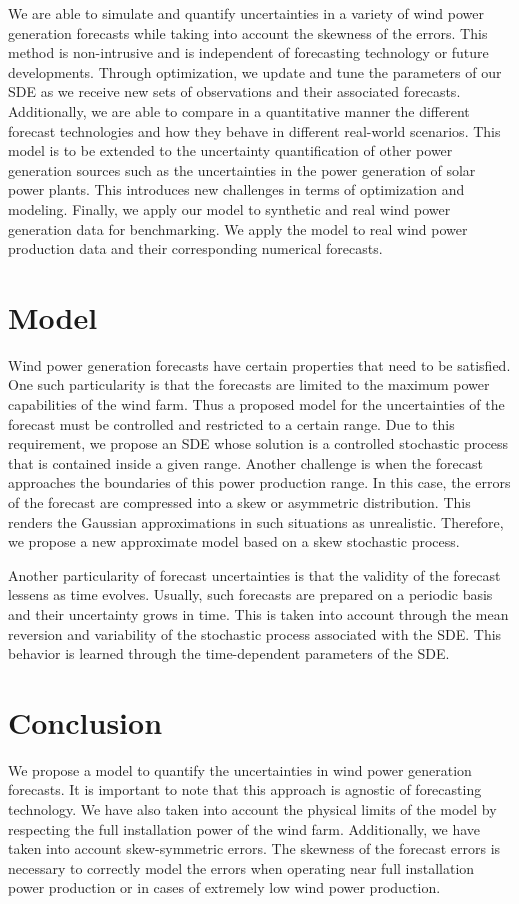 \documentclass[12pt]{article}
\theoremstyle{definition}
\theoremstyle{remark}
\begin{document}
    We are able to simulate and quantify uncertainties in a variety of wind power generation forecasts while taking into account the skewness of the errors. This method is non-intrusive and is independent of forecasting technology or future developments. Through optimization, we update and tune the parameters of our SDE as we receive new sets of observations and their associated forecasts. Additionally, we are able to compare in a quantitative manner the different forecast technologies and how they behave in different real-world scenarios. This model is to be extended to the uncertainty quantification of other power generation sources such as the uncertainties in the power generation of solar power plants. This introduces new challenges in terms of optimization and modeling. Finally, we apply our model to synthetic and real wind power generation data for benchmarking. We apply the model to real  wind power production data and their corresponding numerical forecasts.


\section{Model}
Wind power generation forecasts have certain properties that need to be satisfied. One such particularity is that the forecasts are limited to the maximum power capabilities of the wind farm. Thus a proposed model for the uncertainties of the forecast must be controlled and restricted to a certain range. Due to this requirement, we propose an SDE whose solution is a controlled stochastic process that is contained inside a given range. Another challenge is when the forecast approaches the boundaries of this power production range. In this case, the errors of the forecast are compressed into a skew or asymmetric distribution. This renders the Gaussian approximations in such situations as unrealistic. Therefore, we propose a new approximate model based on a skew stochastic process.

Another particularity of forecast uncertainties is that the validity of the forecast lessens as time evolves. Usually, such forecasts are prepared on a periodic basis and their uncertainty grows in time. This is taken into account through the mean reversion and variability of the stochastic process associated with the SDE. This behavior is learned through the time-dependent parameters of the SDE.

\section{Conclusion}
We  propose a model to quantify the uncertainties in wind power generation forecasts. It is important to note that this approach is agnostic of forecasting technology. We have also taken into account the physical limits of the model by respecting the full installation power of the wind farm. Additionally, we have taken into account skew-symmetric errors. The skewness of the forecast errors is necessary to correctly model the errors when operating near full installation power production or in cases of extremely low wind power production.
\end{document}
